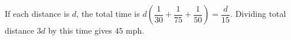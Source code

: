 If each distance is $d$, the total time is $d(\dfrac{1}{30}+\dfrac{1}{75}+\dfrac{1}{50})=\dfrac{d}{15}$. Dividing total distance $3d$ by this time gives $\boxed{45\text{ mph}}$.

